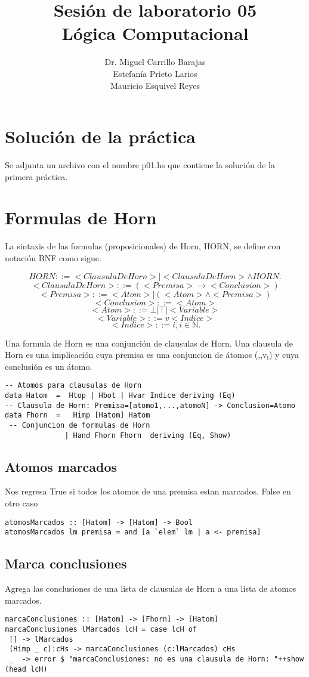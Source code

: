 \documentclass[11pt]{article}
\author{Dr. Miguel Carrillo Barajas \\
Estefanía Prieto Larios \\
Mauricio Esquivel Reyes \\
}
\date{}
\title{Sesión de laboratorio 05 \\
Lógica Computacional}
\begin{document}
\maketitle
\section{Solución de la práctica}
\label{sec:org808f0fe}
Se adjunta un archivo con el nombre p01.hs que contiene la solución de la primera práctica.
\section{Formulas de Horn}
\label{sec:org4fe9465}
La sintaxis de las formulas (proposicionales) de Horn, HORN, se define con notación BNF como sigue.

\[HORN                ::= <ClausulaDeHorn> | <ClausulaDeHorn> \land HORN.\]
\[<ClausulaDeHorn>    ::= (<Premisa> \rightarrow <Conclusion>)\]
\[<Premisa>           ::= <Atom> | (<Atom> \land <Premisa>)\]
\[<Conclusion>        ::= <Atom>\]
\[<Atom>              ::= \bot | \top | <Variable>\]
\[<Variable>          ::= v <Indice>\]
\[<Indice>            ::= i, i \in \mathbb{N}.\]

Una formula de Horn es una conjunción de clausulas de Horn.
Una clausula de Horn es una implicación cuya premisa es una conjuncion de 
átomos (\bot,\top,v\(_{\text{i}}\)) y cuya conclusión es un átomo.

\begin{verbatim}
-- Atomos para clausulas de Horn
data Hatom  =  Htop | Hbot | Hvar Indice deriving (Eq) 
-- Clausula de Horn: Premisa=[atomo1,...,atomoN] -> Conclusion=Atomo
data Fhorn  =   Himp [Hatom] Hatom                     
 -- Conjuncion de formulas de Horn 
              | Hand Fhorn Fhorn  deriving (Eq, Show)  
\end{verbatim}

\subsection{Atomos marcados}
\label{sec:org65143c1}
Nos regresa True si todos los atomos de una premisa estan marcados. False en otro caso
\begin{verbatim}
atomosMarcados :: [Hatom] -> [Hatom] -> Bool
atomosMarcados lm premisa = and [a `elem` lm | a <- premisa] 
\end{verbatim}

\subsection{Marca conclusiones}
\label{sec:orga991cc6}
Agrega las conclusiones de una lista de clausulas de Horn a una lista de atomos marcados.
\begin{verbatim}
marcaConclusiones :: [Hatom] -> [Fhorn] -> [Hatom]
marcaConclusiones lMarcados lcH = case lcH of
 [] -> lMarcados
 (Himp _ c):cHs -> marcaConclusiones (c:lMarcados) cHs
 _  -> error $ "marcaConclusiones: no es una clausula de Horn: "++show (head lcH)
\end{verbatim}
\end{document}
